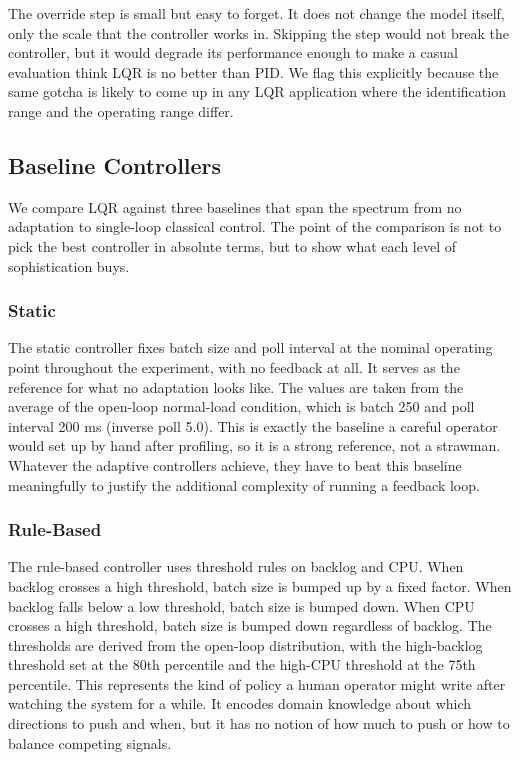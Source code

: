 \documentclass[10pt,a4paper]{article}
\begin{document}
The override step is small but easy to forget. It does not change the model itself, only the scale that the controller works in. Skipping the step would not break the controller, but it would degrade its performance enough to make a casual evaluation think LQR is no better than PID. We flag this explicitly because the same gotcha is likely to come up in any LQR application where the identification range and the operating range differ.

\subsection{Baseline Controllers}

We compare LQR against three baselines that span the spectrum from no adaptation to single-loop classical control. The point of the comparison is not to pick the best controller in absolute terms, but to show what each level of sophistication buys.

\subsubsection{Static}

The static controller fixes batch size and poll interval at the nominal operating point throughout the experiment, with no feedback at all. It serves as the reference for what no adaptation looks like. The values are taken from the average of the open-loop normal-load condition, which is batch 250 and poll interval 200 ms (inverse poll 5.0). This is exactly the baseline a careful operator would set up by hand after profiling, so it is a strong reference, not a strawman. Whatever the adaptive controllers achieve, they have to beat this baseline meaningfully to justify the additional complexity of running a feedback loop.

\subsubsection{Rule-Based}

The rule-based controller uses threshold rules on backlog and CPU. When backlog crosses a high threshold, batch size is bumped up by a fixed factor. When backlog falls below a low threshold, batch size is bumped down. When CPU crosses a high threshold, batch size is bumped down regardless of backlog. The thresholds are derived from the open-loop distribution, with the high-backlog threshold set at the 80th percentile and the high-CPU threshold at the 75th percentile. This represents the kind of policy a human operator might write after watching the system for a while. It encodes domain knowledge about which directions to push and when, but it has no notion of how much to push or how to balance competing signals.
\end{document}
